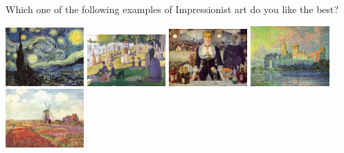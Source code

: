 
\begin{tcolorbox}
Which one of the following examples of Impressionist art do you like the best?

\includegraphics[width=3cm]{Population_study_design/Impressionist_art1.jpg}
\includegraphics[width=3cm]{Population_study_design/Impressionist_art2.jpg}
\includegraphics[width=3cm]{Population_study_design/Impressionist_art3.jpg}
\includegraphics[width=3cm]{Population_study_design/Impressionist_art4.jpg}
\includegraphics[width=3cm]{Population_study_design/Impressionist_art5.jpg}
\end{tcolorbox}

